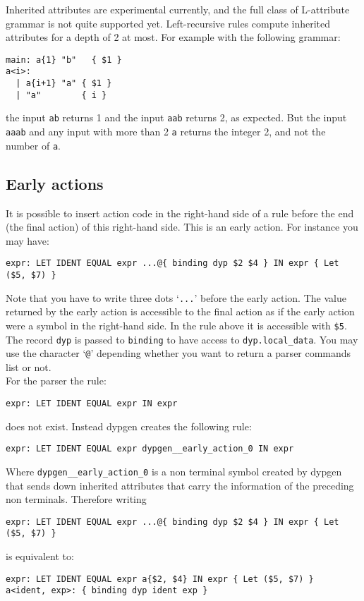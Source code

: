 \documentclass[12pt]{article}
\begin{document}
{Inherited attributes are experimental currently, and the full class of L-attribute grammar is not quite supported yet. Left-recursive rules compute inherited attributes for a depth of 2 at most. For example with the following grammar:
\begin{verbatim}
main: a{1} "b"   { $1 }
a<i>:
  | a{i+1} "a" { $1 }
  | "a"        { i }
\end{verbatim}
the input \verb|ab| returns 1 and the input \verb|aab| returns 2, as expected. But the input \verb|aaab| and any input with more than 2 \verb|a| returns the integer 2, and not the number of \verb|a|.

\subsection{Early actions}

It is possible to insert action code in the right-hand side of a rule before the end (the final action) of this right-hand side. This is an early action. For instance you may have:
\begin{verbatim}
expr: LET IDENT EQUAL expr ...@{ binding dyp $2 $4 } IN expr { Let ($5, $7) }
\end{verbatim}
Note that you have to write three dots `\verb|...|' before the early action. The value returned by the early action is accessible to the final action as if the early action were a symbol in the right-hand side. In the rule above it is accessible with \verb|$5|. The record \verb|dyp| is passed to \verb|binding| to have access to \verb|dyp.local_data|. You may use the character `\verb|@|' depending whether you want to return a parser commands list or not.\\

For the parser the rule:
\begin{verbatim}
expr: LET IDENT EQUAL expr IN expr
\end{verbatim}
does not exist. Instead dypgen creates the following rule:
\begin{verbatim}
expr: LET IDENT EQUAL expr dypgen__early_action_0 IN expr
\end{verbatim}
Where \verb|dypgen__early_action_0| is a non terminal symbol created by dypgen that sends down inherited attributes that carry the information of the preceding non terminals. Therefore writing
\begin{verbatim}
expr: LET IDENT EQUAL expr ...@{ binding dyp $2 $4 } IN expr { Let ($5, $7) }
\end{verbatim}
is equivalent to:
\begin{verbatim}
expr: LET IDENT EQUAL expr a{$2, $4} IN expr { Let ($5, $7) }
a<ident, exp>: { binding dyp ident exp }
\end{verbatim}

}
\end{document}
